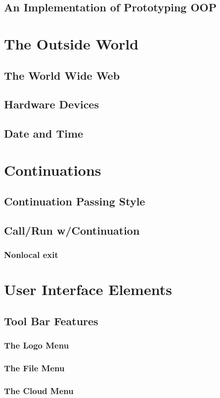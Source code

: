 \documentclass{report}
\begin{document}
\section{An Implementation of Prototyping OOP}
\chapter{The Outside World}
\section{The World Wide Web}
\section{Hardware Devices}
\section{Date and Time}
\chapter{Continuations}
\section{Continuation Passing Style}
\section{Call/Run w/Continuation}
\subsection{Nonlocal exit}
\chapter{User Interface Elements}
\section{Tool Bar Features}
\subsection{The \Snap{} Logo Menu}
\subsection{The File Menu}
\subsection{The Cloud Menu}
\end{document}
